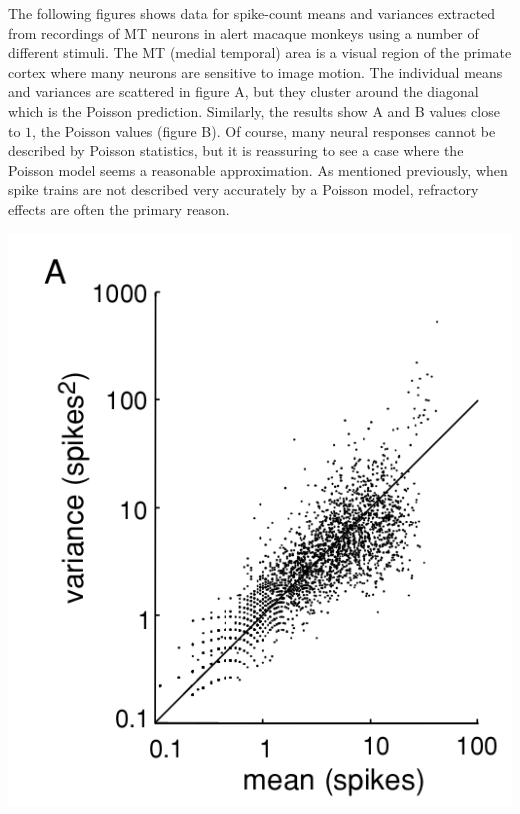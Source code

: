 \begin{exm}
    The following figures shows data for spike-count means and variances extracted
from recordings of MT neurons in alert macaque monkeys using a number of different stimuli. The MT (medial temporal) area is a visual region of the primate cortex where many neurons are sensitive to image motion.
The individual means and variances are scattered in figure A,  but they
cluster around the diagonal which is the Poisson prediction. Similarly,  the
results show A and B values close to $1$,  the Poisson values (figure B).
Of course,  many neural responses cannot be described by Poisson statistics,  but it is reassuring to see a case where the Poisson model seems a
reasonable approximation. As mentioned previously,  when spike trains
are not described very accurately by a Poisson model,  refractory effects
are often the primary reason.
\end{exm}
\begin{center}
    \label{fig:1.14A}    
    \includegraphics[scale = 0.36]{png/Figure1-14-A.png}\\
\end{center}

